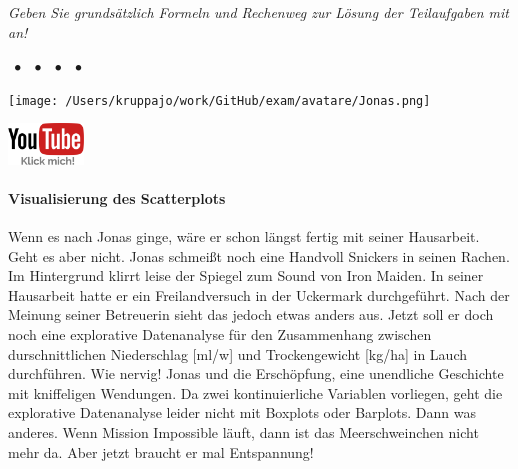 \documentclass[a4paper, 9pt]{scrartcl}\usepackage[]{graphicx}\usepackage[]{xcolor}
\begin{document}
\textit{Geben Sie grundsätzlich Formeln und Rechenweg zur Lösung der Teilaufgaben mit an!} \\[1Ex]
 

 
\ifcollection
\begin{flushright}
\tiny\vspace{-3Ex}
\textbf{\examinhaltstart}
\exammodulemathstat $\;\bullet$
\exammodulestat $\;\bullet$
\exammodulestatbbv $\;\bullet$
\exammodulestatversuch $\;\bullet$
\exammodulebiostat
\vspace{-4Ex}
\end{flushright}
\begin{minipage}[t]{0.5\textwidth}
\texttt{[image: /Users/kruppajo/work/GitHub/exam/avatare/Jonas.png]}
\end{minipage}
\begin{minipage}[t]{0.5\textwidth}
\hfill
\href{https://youtu.be/VAqiUdV4WQ0}{\includegraphics[width = 2cm]{img/youtube}}
\end{minipage}
\vspace{-3ex}
\fi




\ifcollection
\paragraph{Visualisierung des Scatterplots}
\fi

Wenn es nach Jonas ginge, wäre er schon längst fertig mit seiner Hausarbeit. Geht es aber nicht. Jonas schmeißt noch eine Handvoll Snickers in seinen Rachen. Im Hintergrund klirrt leise der Spiegel zum Sound von Iron Maiden. In seiner Hausarbeit hatte er ein Freilandversuch in der Uckermark durchgeführt. Nach der Meinung seiner Betreuerin sieht das jedoch etwas anders aus. Jetzt soll er doch noch eine explorative Datenanalyse für den Zusammenhang zwischen durschnittlichen Niederschlag [ml/w] und Trockengewicht [kg/ha] in Lauch durchführen. Wie nervig! Jonas und die Erschöpfung, eine unendliche Geschichte mit kniffeligen Wendungen. Da zwei kontinuierliche Variablen vorliegen, geht die explorative Datenanalyse leider nicht mit Boxplots oder Barplots. Dann was anderes. Wenn Mission Impossible läuft, dann ist das Meerschweinchen nicht mehr da. Aber jetzt braucht er mal Entspannung!
\end{document}
